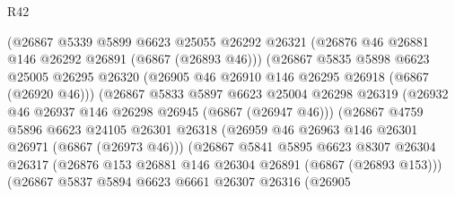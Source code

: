 \begin{lexlean}{R42}
\begin{coremodule}
{                              (@26867
                                @5339
                                @5899
                                @6623
                                @25055
                                @26292
                                @26321
                                (@26876 @46 @26881 @146 @26292 @26891 (@6867 (@26893 @46)))
                                (@26867
                                  @5835
                                  @5898
                                  @6623
                                  @25005
                                  @26295
                                  @26320
                                  (@26905 @46 @26910 @146 @26295 @26918 (@6867 (@26920 @46)))
                                  (@26867
                                    @5833
                                    @5897
                                    @6623
                                    @25004
                                    @26298
                                    @26319
                                    (@26932 @46 @26937 @146 @26298 @26945 (@6867 (@26947 @46)))
                                    (@26867
                                      @4759
                                      @5896
                                      @6623
                                      @24105
                                      @26301
                                      @26318
                                      (@26959 @46 @26963 @146 @26301 @26971 (@6867 (@26973 @46)))
                                      (@26867
                                        @5841
                                        @5895
                                        @6623
                                        @8307
                                        @26304
                                        @26317
                                        (@26876
                                          @153
                                          @26881
                                          @146
                                          @26304
                                          @26891
                                          (@6867 (@26893 @153)))
                                        (@26867
                                          @5837
                                          @5894
                                          @6623
                                          @6661
                                          @26307
                                          @26316
                                          (@26905
}
\end{coremodule}
\end{lexlean}
